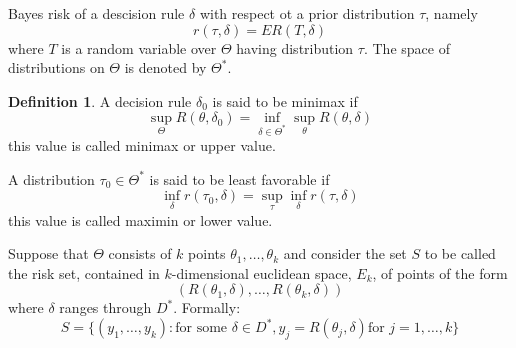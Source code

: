 \documentclass{scrartcl}
\theoremstyle{definition}
\newtheorem{definition}{Definition}
\theoremstyle{theorem}
\begin{document}
Bayes risk of a descision rule $\delta$ with respect ot a prior distribution $\tau$, namely
\[
r(\tau,\delta)=ER(T,\delta)
\]
where $T$ is a random variable over $\Theta$ having distribution $\tau$. The space of distributions on $\Theta$ is denoted by $\Theta^\ast$.


\begin{definition}
	A decision rule $\delta_0$ is said to be minimax if\[
	\sup_\Theta R(\theta,\delta_0)=\inf_{\delta\in \Theta^\ast}\sup_\theta R(\theta,\delta)
	\]
	this value is called minimax or upper value.
\end{definition}

A distribution $\tau_0\in \Theta^\ast$ is said to be least favorable if 
\[
\inf_\delta r(\tau_0,\delta)=\sup_\tau\inf_\delta r(\tau,\delta)
\]
this value is called maximin or lower value.


Suppose that $\Theta$ consists of $k$ points $\theta_1,\dots,\theta_k$ and consider the set $S$ to be called the risk set, contained in $k$-dimensional euclidean space, $E_k$, of points of the form 
\[
(R(\theta_1,\delta),\dots,R(\theta_k,\delta))
\]
where $\delta$ ranges through $D^\ast$.
Formally:
\[
S=\{(y_1,\dots,y_k):\text{for some }\delta\in D^\ast, y_j=R(\theta_j,\delta) \text{for }j=1,\dots,k\}
\]
\end{document}
